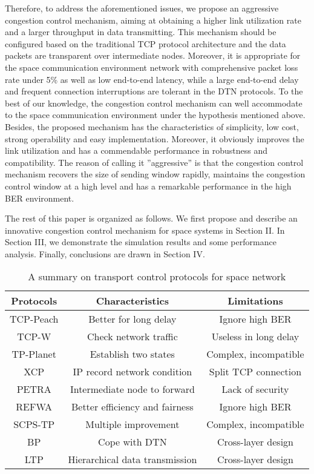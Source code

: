 \documentclass[draftclsnofoot,onecolumn,11pt]{IEEEtran}
\begin{document}
Therefore, to address the aforementioned issues, we propose an aggressive congestion control mechanism, aiming at obtaining a higher link utilization rate and a larger throughput in data transmitting. This mechanism should be configured based on the traditional TCP protocol architecture and the data packets are transparent over intermediate nodes. Moreover, it is appropriate for the space communication environment network with comprehensive packet loss rate under 5\% as well as low end-to-end latency, while a large end-to-end delay and frequent connection interruptions are tolerant in the DTN protocols. To the best of our knowledge, the congestion control mechanism can well accommodate to the space communication environment under the hypothesis mentioned above. Besides, the proposed mechanism has the characteristics of simplicity, low cost, strong operability and easy implementation. Moreover, it obviously improves the link utilization and has a commendable performance in robustness and compatibility. The reason of calling it ''aggressive'' is that the congestion control mechanism recovers the size of sending window rapidly, maintains the congestion control window at a high level and has a remarkable performance in the high BER environment.

The rest of this paper is organized as follows. We first propose and describe an innovative congestion control mechanism for space systems in Section II. In Section III, we demonstrate the simulation results and some performance analysis. Finally, conclusions are drawn in Section IV.


\begin{table}
\centering
\caption{A summary on transport control protocols for space network}
\label{Table.1}
\begin{tabular}{||c|c|c||}
  \hline
 Protocols  &  Characteristics &  Limitations \\
  \hline
TCP-Peach& Better for long delay & Ignore high BER \\
  \hline
TCP-W& Check network traffic& Useless in long delay \\
  \hline
TP-Planet& Establish two states & Complex, incompatible \\
  \hline
XCP& IP record network condition & Split TCP connection \\
  \hline
PETRA& Intermediate node to forward & Lack of security \\
  \hline
REFWA& Better efficiency and fairness  & Ignore high BER \\
  \hline
SCPS-TP& Multiple improvement & Complex, incompatible \\
  \hline
BP& Cope with DTN & Cross-layer design  \\
  \hline
LTP& Hierarchical data transmission & Cross-layer design \\
  \hline
\end{tabular}
\end{table}
\end{document}
